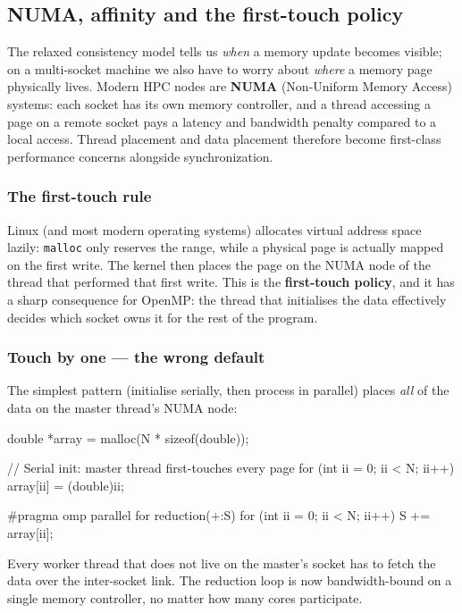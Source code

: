 \subsection{NUMA, affinity and the first-touch policy}

The relaxed consistency model tells us \textit{when} a memory update becomes visible; on a multi-socket machine we also have to worry about \textit{where} a memory page physically lives. Modern HPC nodes are \textbf{NUMA} (Non-Uniform Memory Access) systems: each socket has its own memory controller, and a thread accessing a page on a remote socket pays a latency and bandwidth penalty compared to a local access. Thread placement and data placement therefore become first-class performance concerns alongside synchronization.

\subsubsection{The first-touch rule}

Linux (and most modern operating systems) allocates virtual address space lazily: \texttt{malloc} only reserves the range, while a physical page is actually mapped on the first write. The kernel then places the page on the NUMA node of the thread that performed that first write. This is the \textbf{first-touch policy}, and it has a sharp consequence for OpenMP: the thread that initialises the data effectively decides which socket owns it for the rest of the program.

\subsubsection{Touch by one --- the wrong default}

The simplest pattern (initialise serially, then process in parallel) places \emph{all} of the data on the master thread's NUMA node:

\begin{codeblock}[language = C, morekeywords={pragma}]
double *array = malloc(N * sizeof(double));

// Serial init: master thread first-touches every page
for (int ii = 0; ii < N; ii++)
    array[ii] = (double)ii;

#pragma omp parallel for reduction(+:S)
for (int ii = 0; ii < N; ii++)
    S += array[ii];
\end{codeblock}

Every worker thread that does not live on the master's socket has to fetch the data over the inter-socket link. The reduction loop is now bandwidth-bound on a single memory controller, no matter how many cores participate.

